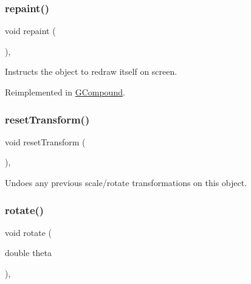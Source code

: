 \subsubsection{\texorpdfstring{repaint()}{repaint()}}
{\footnotesize\ttfamily void repaint (\begin{DoxyParamCaption}{ }\end{DoxyParamCaption})\hspace{0.3cm}{\ttfamily [virtual]}, {\ttfamily [inherited]}}



Instructs the object to redraw itself on screen. 



Reimplemented in \mbox{\hyperlink{classsgl_1_1GCompound_afb8dbc55702230f0030e47d6c009697f}{G\+Compound}}.

\mbox{\label{classsgl_1_1GObject_a6022a1fd1e5dcd2fd5585e5a36aa3f37}} 
\subsubsection{\texorpdfstring{reset\+Transform()}{resetTransform()}}
{\footnotesize\ttfamily void reset\+Transform (\begin{DoxyParamCaption}{ }\end{DoxyParamCaption})\hspace{0.3cm}{\ttfamily [virtual]}, {\ttfamily [inherited]}}



Undoes any previous scale/rotate transformations on this object. 

\mbox{\label{classsgl_1_1GObject_ae1ffaa12185dfd5ba464f7d87c329e26}} 
\subsubsection{\texorpdfstring{rotate()}{rotate()}}
{\footnotesize\ttfamily void rotate (\begin{DoxyParamCaption}\item[{double}]{theta }\end{DoxyParamCaption})\hspace{0.3cm}{\ttfamily [virtual]}, {\ttfamily [inherited]}}



